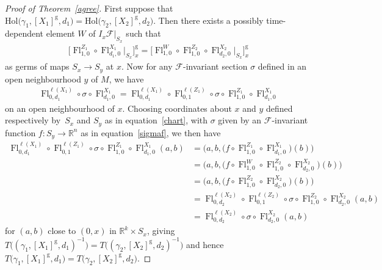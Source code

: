 \documentclass[10pt,a4paper]{amsart}
\numberwithin{equation}{section}
\def\g{\operatorname{g}}
\def\Fl{\operatorname{Fl}}
\def\FF{{\mathcal{F}}}
\def\RB{{\mathbb{R}}}
\begin{document}
\begin{proof}[Proof of Theorem~\ref{agree}]
First suppose that $\text{Hol}\big(\gamma_{1},[X_{1}]^{\g},d_{1}\big) = \text{Hol}\big(\gamma_{2},[X_{2}]^{\g},d_{2}\big)$. Then there exists a possibly time-dependent element $W$ of $I_{x}\FF|_{S_{x}}$ such that
\begin{gather*}
\big[\Fl^{Z_{1}}_{1,0}\circ\Fl^{X_{1}}_{d_{1},0}\big|_{S_{x}}\big]^{\g}_{x} = \big[\Fl^{W}_{1,0}\circ\Fl^{Z_{2}}_{1,0}\circ\Fl^{X_{2}}_{d_{2},0}\big|_{S_{x}}\big]^{\g}_{x}
\end{gather*}
as germs of maps $S_{x}\rightarrow S_{y}$ at $x$. Now for any $\FF$-invariant section $\sigma$ defined in an open neighbourhood $y$ of $M$, we have
\begin{gather*}
\Fl^{\ell(X_{1})}_{0,d_{1}}\circ\sigma\circ\Fl^{X_{1}}_{d_{1},0} = \Fl^{\ell(X_{1})}_{0,d_{1}}\circ\Fl^{\ell(Z_{1})}_{0,1}\circ\sigma\circ\Fl^{Z_{1}}_{1,0}\circ\Fl^{X_{1}}_{d_{1},0}
\end{gather*}
on an open neighbourhood of $x$. Choosing coordinates about $x$ and $y$ defined respectively by~$S_{x}$ and $S_{y}$ as in equation~\eqref{chart}, with $\sigma$ given by an $\FF$-invariant function $f\colon S_{y}\rightarrow\RB^{n}$ as in equation~\eqref{sigmaf}, we then have
\begin{align*}
\Fl^{\ell(X_{1})}_{0,d_{1}}\circ\Fl^{\ell(Z_{1})}_{0,1}\circ\sigma\circ\Fl^{Z_{1}}_{1,0} \circ\Fl^{X_{1}}_{d_{1},0}(a,b) &= \big(a,b,\big(f\circ\Fl^{Z_{1}}_{1,0}\circ\Fl^{X_{1}}_{d_{1},0}\big)(b)\big)
\\
&= \big(a,b,\big(f\circ\Fl^{W}_{1,0}\circ\Fl^{Z_{2}}_{1,0}\circ\Fl^{X_{2}}_{d_{2},0}\big)(b)\big)
\\
&= \big(a,b,\big(f\circ\Fl^{Z_{2}}_{1,0}\circ\Fl^{X_{2}}_{d_{2},0}\big)(b)\big)
\\
&=\Fl^{\ell(X_{2})}_{0,d_{2}}\circ\Fl^{\ell(Z_{2})}_{0,1}\circ\sigma\circ\Fl^{Z_{2}}_{1,0} \circ\Fl^{X_{2}}_{d_{2},0}(a,b)
\\
&= \Fl^{\ell(X_{2})}_{0,d_{2}}\circ\sigma\circ\Fl^{X_{2}}_{d_{2},0}(a,b)
\end{align*}
for $(a,b)$ close to $(0,x)$ in $\RB^{k}\times S_{x}$, giving $T\big((\gamma_{1},[X_{1}]^{\g},d_{1})^{-1}\big) = T\big((\gamma_{2},[X_{2}]^{\g},d_{2})^{-1}\big)$ and hence $T\big(\gamma_{1},[X_{1}]^{\g},d_{1}\big) = T\big(\gamma_{2},[X_{2}]^{\g},d_{2}\big)$.


\end{proof}
\end{document}
